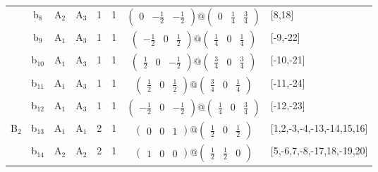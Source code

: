 \documentclass[fleqn,10pt,landscape]{article}
\begin{document}
\begin{itemize}
\begin{center}
\begin{longtable}{cc|cc|c|c|c|l}
& b$_{8}$ & A$_{2}$ & A$_{3}$ & 1 & 1 & $\begin{pmatrix} 0 & - \frac{1}{2} & - \frac{1}{2} \end{pmatrix}@\begin{pmatrix} 0 & \frac{1}{4} & \frac{3}{4} \end{pmatrix}$ & [8,18] \\
& b$_{9}$ & A$_{1}$ & A$_{3}$ & 1 & 1 & $\begin{pmatrix} - \frac{1}{2} & 0 & \frac{1}{2} \end{pmatrix}@\begin{pmatrix} \frac{1}{4} & 0 & \frac{1}{4} \end{pmatrix}$ & [-9,-22] \\
& b$_{10}$ & A$_{1}$ & A$_{3}$ & 1 & 1 & $\begin{pmatrix} \frac{1}{2} & 0 & - \frac{1}{2} \end{pmatrix}@\begin{pmatrix} \frac{3}{4} & 0 & \frac{3}{4} \end{pmatrix}$ & [-10,-21] \\
& b$_{11}$ & A$_{1}$ & A$_{3}$ & 1 & 1 & $\begin{pmatrix} \frac{1}{2} & 0 & \frac{1}{2} \end{pmatrix}@\begin{pmatrix} \frac{3}{4} & 0 & \frac{1}{4} \end{pmatrix}$ & [-11,-24] \\
& b$_{12}$ & A$_{1}$ & A$_{3}$ & 1 & 1 & $\begin{pmatrix} - \frac{1}{2} & 0 & - \frac{1}{2} \end{pmatrix}@\begin{pmatrix} \frac{1}{4} & 0 & \frac{3}{4} \end{pmatrix}$ & [-12,-23] \\ \hline
B$_{2}$ & b$_{13}$ & A$_{1}$ & A$_{1}$ & 2 & 1 & $\begin{pmatrix} 0 & 0 & 1 \end{pmatrix}@\begin{pmatrix} \frac{1}{2} & 0 & \frac{1}{2} \end{pmatrix}$ & [1,2,-3,-4,-13,-14,15,16] \\
& b$_{14}$ & A$_{2}$ & A$_{2}$ & 2 & 1 & $\begin{pmatrix} 1 & 0 & 0 \end{pmatrix}@\begin{pmatrix} \frac{1}{2} & \frac{1}{2} & 0 \end{pmatrix}$ & [5,-6,7,-8,-17,18,-19,20] \\

\end{longtable}
\end{center}
\end{itemize}
\end{document}
